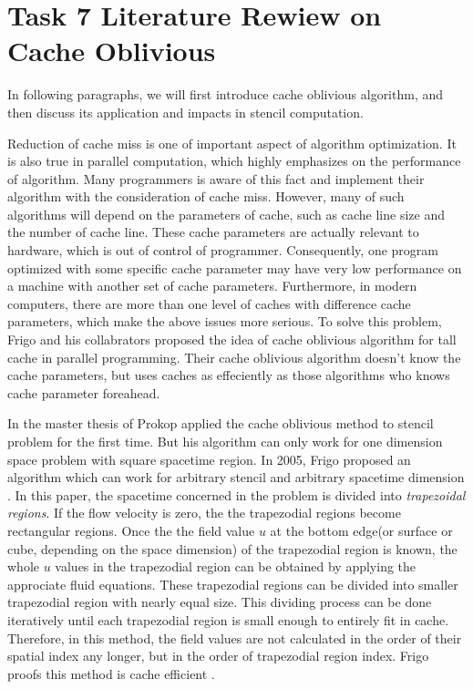 \section{Task 7 Literature Rewiew on Cache Oblivious}

In following paragraphs, we will first introduce cache oblivious algorithm,
and then discuss its application and impacts in stencil computation.

\vspace{\baselineskip}

Reduction of cache miss is one of important aspect of algorithm optimization.
It is also true in parallel computation, which highly emphasizes on the performance of algorithm.
Many programmers is aware of this fact and implement their algorithm with the consideration of cache miss.
However, many of such algorithms will depend on the parameters of cache, such as cache line size and the number of cache line.
These cache parameters are actually relevant to hardware, which is out of control of programmer.
Consequently, one program optimized with some specific cache parameter may have very low performance on a machine with another set of cache parameters. 
Furthermore, in modern computers, there are more than one level of caches with difference cache parameters, which make the above issues more serious.
To solve this problem, Frigo and his collabrators \cite{Frigo1999} proposed the idea of cache oblivious algorithm for tall cache in parallel programming. 
Their cache oblivious algorithm doesn't know the cache parameters, 
but uses caches as effeciently as those algorithms who knows cache parameter foreahead.

In the master thesis of Prokop \cite{Prokop1999} applied the cache oblivious method to stencil problem for the first time.
But his algorithm can only work for one dimension space problem with square spacetime region.
In 2005, Frigo proposed an algorithm which can work for arbitrary stencil and arbitrary spacetime dimension \cite{Frigo2005}.
In this paper, the spacetime concerned in the problem is divided into \textit{trapezoidal regions}.
If the flow velocity is zero, the the trapezodial regions become rectangular regions.
Once the the field value $u$ at the bottom edge(or surface or cube, depending on the space dimension) of the trapezodial region is known, 
the whole $u$ values in the trapezodial region can be obtained by applying the approciate fluid equations.
These trapezodial regions can be divided into smaller trapezodial region with nearly equal size.
This dividing process can be done iteratively until each trapezodial region is small enough to entirely fit in cache.
Therefore, in this method, the field values are not calculated in the order of their spatial index any longer, 
but in the order of trapezodial region index.
Frigo proofs this method is cache efficient \cite{Frigo2005}.

